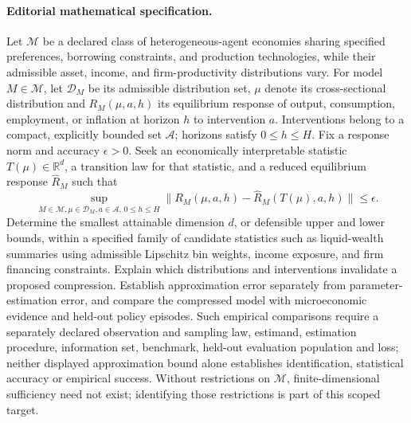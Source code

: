 \documentclass[11pt,a4paper]{article}
\begin{document}
\paragraph{Editorial mathematical specification.} Let \(\mathcal M\) be a declared class of heterogeneous-agent economies sharing specified preferences, borrowing constraints, and production technologies, while their admissible asset, income, and firm-productivity distributions vary. For model \(M\in\mathcal M\), let \(\mathcal D_M\) be its admissible distribution set, \(\mu\) denote its cross-sectional distribution and \(R_M(\mu,a,h)\) its equilibrium response of output, consumption, employment, or inflation at horizon \(h\) to intervention \(a\). Interventions belong to a compact, explicitly bounded set \(\mathcal A\); horizons satisfy \(0\le h\le H\). Fix a response norm and accuracy \(\epsilon>0\).
Seek an economically interpretable statistic \(T(\mu)\in\mathbb R^d\), a transition law for that statistic, and a reduced equilibrium response \(\widehat R_M\) such that
\[
\sup_{M\in\mathcal M,\mu\in\mathcal D_M,a\in\mathcal A,\,0\le h\le H}
\|R_M(\mu,a,h)-\widehat R_M(T(\mu),a,h)\|\le\epsilon.
\]
Determine the smallest attainable dimension \(d\), or defensible upper and lower bounds, within a specified family of candidate statistics such as liquid-wealth summaries using admissible Lipschitz bin weights, income exposure, and firm financing constraints. Explain which distributions and interventions invalidate a proposed compression. Establish approximation error separately from parameter-estimation error, and compare the compressed model with microeconomic evidence and held-out policy episodes. Such empirical comparisons require a separately declared observation and sampling law, estimand, estimation procedure, information set, benchmark, held-out evaluation population and loss; neither displayed approximation bound alone establishes identification, statistical accuracy or empirical success. Without restrictions on \(\mathcal M\), finite-dimensional sufficiency need not exist; identifying those restrictions is part of this scoped target.
\end{document}
